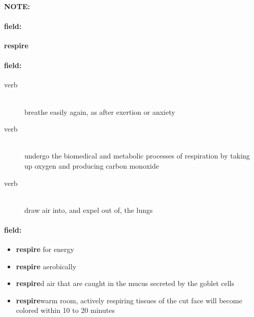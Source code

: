 \documentclass[12pt]{article}
\newenvironment{note}{\paragraph{NOTE:}}{}
\newenvironment{field}{\paragraph{field:}}{}
\begin{document}
\begin{note}
\begin{field}
\textbf{\large respire}
\end{field}


\begin{field}
\begin{description}
\item[verb] \hfill \\ 
breathe easily again, as after exertion or anxiety

\item[verb] \hfill \\ 
undergo the biomedical and metabolic processes of respiration by taking up oxygen and producing carbon monoxide

\item[verb] \hfill \\ 
draw air into, and expel out of, the lungs

\end{description}
\end{field}

\begin{field}
\begin{itemize}
\item \textbf{respire} for energy
\item \textbf{respire} aerobically
\item \textbf{respire}d air that are caught in the mucus secreted by the goblet cells
\item \textbf{respire}warm room, actively respiring tissues of the cut face will become colored within 10 to 20 minutes
\end{itemize}
\end{field}
\end{note}
\end{document}
